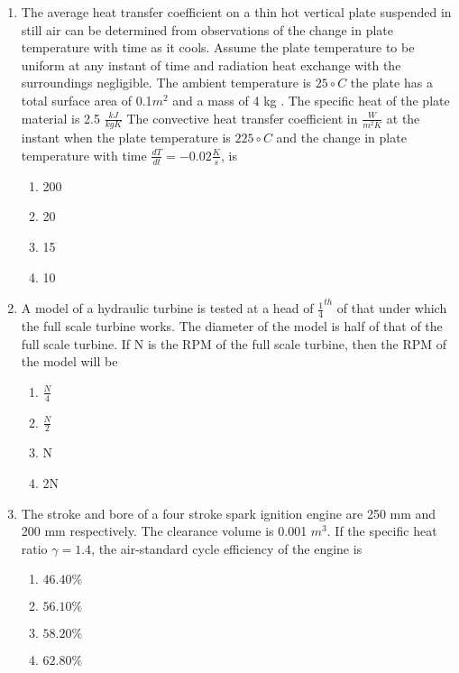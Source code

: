 \documentclass[journal]{IEEEtran}
\begin{document}
\begin{enumerate}
\begin{multicols}{4}
\begin{enumerate}
              \item 30
              \item 35
              \item 45
            \end{enumerate}
        \end{multicols}
\item The average heat transfer coefficient on a thin hot vertical plate suspended in still air can be determined from observations of the change in plate temperature with time as it cools. Assume the plate temperature to be uniform at any instant of time and radiation heat exchange with the surroundings negligible. The ambient temperature is $25{\circ} C $  the plate has a total surface area of 0.1$m^2$ and a mass of 4 kg . The specific heat of the plate material is 2.5 $\frac{kJ}{kgK}$ The convective heat transfer coefficient in $\frac{W}{m^2K}$ at the instant when the plate temperature is $225{\circ}C$ and the change in plate temperature with time $\frac{dT}{dt}=-0.02\frac{K}{s}$, is
        \begin{multicols}{4}
            \begin{enumerate}
              \item 200
              \item  20
              \item 15
              \item 10
            \end{enumerate}
        \end{multicols}
\item A model of a hydraulic turbine is tested at a head of $\frac{1}{4}^{th}$ of that under which the full scale turbine works. The diameter of the model is half of that of the full scale turbine. If N is the RPM of the full scale turbine, then the RPM of the model will be
        \begin{multicols}{4}
            \begin{enumerate}
              \item $\frac{N}{4}$
              \item  $\frac{N}{2}$
              \item N
              \item 2N
            \end{enumerate}
        \end{multicols}
\item  The stroke and bore of a four stroke spark ignition engine are 250 mm and 200 mm respectively. The clearance volume is 0.001 $m^{3}$. If the specific heat ratio $\gamma=1.4$,
        the air-standard cycle efficiency of the engine is
        \begin{multicols}{4}
        \begin{enumerate}
        \item $46.40 \%$
        \item $56.10 \%$
          \item  $58.20 \% $
          \item $62.80 \% $
          \end{enumerate}
        \end{multicols}

        
 \end{enumerate}
\end{document}
